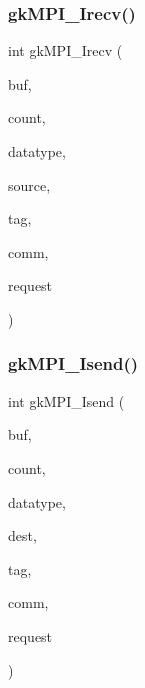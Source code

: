 \mbox{\label{a00951_af66daa80152ba26f528a2c6d9c86e98c}} 
\subsubsection{\texorpdfstring{gk\+M\+P\+I\+\_\+\+Irecv()}{gkMPI\_Irecv()}}
{\footnotesize\ttfamily int gk\+M\+P\+I\+\_\+\+Irecv (\begin{DoxyParamCaption}\item[{void $\ast$}]{buf,  }\item[{\hyperlink{a00876_aaa5262be3e700770163401acb0150f52}{idx\+\_\+t}}]{count,  }\item[{M\+P\+I\+\_\+\+Datatype}]{datatype,  }\item[{\hyperlink{a00876_aaa5262be3e700770163401acb0150f52}{idx\+\_\+t}}]{source,  }\item[{\hyperlink{a00876_aaa5262be3e700770163401acb0150f52}{idx\+\_\+t}}]{tag,  }\item[{M\+P\+I\+\_\+\+Comm}]{comm,  }\item[{M\+P\+I\+\_\+\+Request $\ast$}]{request }\end{DoxyParamCaption})}

\mbox{\label{a00951_a575274feee728e0cabbca8b68fcea3fb}} 
\subsubsection{\texorpdfstring{gk\+M\+P\+I\+\_\+\+Isend()}{gkMPI\_Isend()}}
{\footnotesize\ttfamily int gk\+M\+P\+I\+\_\+\+Isend (\begin{DoxyParamCaption}\item[{void $\ast$}]{buf,  }\item[{\hyperlink{a00876_aaa5262be3e700770163401acb0150f52}{idx\+\_\+t}}]{count,  }\item[{M\+P\+I\+\_\+\+Datatype}]{datatype,  }\item[{\hyperlink{a00876_aaa5262be3e700770163401acb0150f52}{idx\+\_\+t}}]{dest,  }\item[{\hyperlink{a00876_aaa5262be3e700770163401acb0150f52}{idx\+\_\+t}}]{tag,  }\item[{M\+P\+I\+\_\+\+Comm}]{comm,  }\item[{M\+P\+I\+\_\+\+Request $\ast$}]{request }\end{DoxyParamCaption})}

